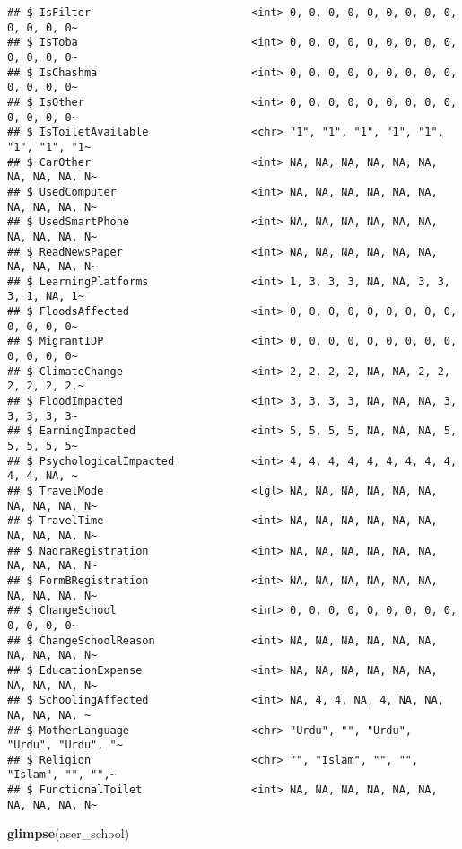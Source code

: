 \documentclass[
]{article}
\newenvironment{Shaded}{\begin{snugshade}}{\end{snugshade}}
\newcommand{\FunctionTok}[1]{\textcolor[rgb]{0.13,0.29,0.53}{\textbf{#1}}}
\newcommand{\NormalTok}[1]{#1}
\begin{document}
\begin{verbatim}
## $ IsFilter                         <int> 0, 0, 0, 0, 0, 0, 0, 0, 0, 0, 0, 0, 0~
## $ IsToba                           <int> 0, 0, 0, 0, 0, 0, 0, 0, 0, 0, 0, 0, 0~
## $ IsChashma                        <int> 0, 0, 0, 0, 0, 0, 0, 0, 0, 0, 0, 0, 0~
## $ IsOther                          <int> 0, 0, 0, 0, 0, 0, 0, 0, 0, 0, 0, 0, 0~
## $ IsToiletAvailable                <chr> "1", "1", "1", "1", "1", "1", "1", "1~
## $ CarOther                         <int> NA, NA, NA, NA, NA, NA, NA, NA, NA, N~
## $ UsedComputer                     <int> NA, NA, NA, NA, NA, NA, NA, NA, NA, N~
## $ UsedSmartPhone                   <int> NA, NA, NA, NA, NA, NA, NA, NA, NA, N~
## $ ReadNewsPaper                    <int> NA, NA, NA, NA, NA, NA, NA, NA, NA, N~
## $ LearningPlatforms                <int> 1, 3, 3, 3, NA, NA, 3, 3, 3, 1, NA, 1~
## $ FloodsAffected                   <int> 0, 0, 0, 0, 0, 0, 0, 0, 0, 0, 0, 0, 0~
## $ MigrantIDP                       <int> 0, 0, 0, 0, 0, 0, 0, 0, 0, 0, 0, 0, 0~
## $ ClimateChange                    <int> 2, 2, 2, 2, NA, NA, 2, 2, 2, 2, 2, 2,~
## $ FloodImpacted                    <int> 3, 3, 3, 3, NA, NA, NA, 3, 3, 3, 3, 3~
## $ EarningImpacted                  <int> 5, 5, 5, 5, NA, NA, NA, 5, 5, 5, 5, 5~
## $ PsychologicalImpacted            <int> 4, 4, 4, 4, 4, 4, 4, 4, 4, 4, 4, NA, ~
## $ TravelMode                       <lgl> NA, NA, NA, NA, NA, NA, NA, NA, NA, N~
## $ TravelTime                       <int> NA, NA, NA, NA, NA, NA, NA, NA, NA, N~
## $ NadraRegistration                <int> NA, NA, NA, NA, NA, NA, NA, NA, NA, N~
## $ FormBRegistration                <int> NA, NA, NA, NA, NA, NA, NA, NA, NA, N~
## $ ChangeSchool                     <int> 0, 0, 0, 0, 0, 0, 0, 0, 0, 0, 0, 0, 0~
## $ ChangeSchoolReason               <int> NA, NA, NA, NA, NA, NA, NA, NA, NA, N~
## $ EducationExpense                 <int> NA, NA, NA, NA, NA, NA, NA, NA, NA, N~
## $ SchoolingAffected                <int> NA, 4, 4, NA, 4, NA, NA, NA, NA, NA, ~
## $ MotherLanguage                   <chr> "Urdu", "", "Urdu", "Urdu", "Urdu", "~
## $ Religion                         <chr> "", "Islam", "", "", "Islam", "", "",~
## $ FunctionalToilet                 <int> NA, NA, NA, NA, NA, NA, NA, NA, NA, N~
\end{verbatim}

\begin{Shaded}
\begin{Highlighting}[]
\FunctionTok{glimpse}\NormalTok{(aser\_school)}
\end{Highlighting}
\end{Shaded}
\end{document}
